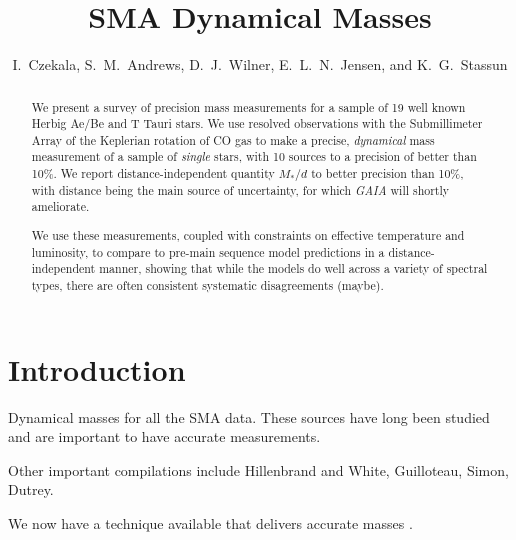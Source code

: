 \documentclass[twocolumn]{aastex6}
\begin{document}
\title{SMA Dynamical Masses}
\author{I.~Czekala, S.~M.~Andrews, D.~J.~Wilner, E.~L.~N.~Jensen, and K.~G.~Stassun}

\begin{abstract}
We present a survey of precision mass measurements for a sample of 19 well known Herbig Ae/Be and T Tauri stars. We use resolved observations with the Submillimeter Array of the Keplerian rotation of CO gas to make a precise, \emph{dynamical} mass measurement of a sample of \emph{single} stars, with 10 sources to a precision of better than 10\%. We report distance-independent quantity $M_\ast/d$ to better precision than 10\%, with distance being the main source of uncertainty, for which \emph{GAIA} will shortly ameliorate.

We use these measurements, coupled with constraints on effective temperature and luminosity, to compare to pre-main sequence model predictions in a distance-independent manner, showing that while the models do well across a variety of spectral types, there are often consistent systematic disagreements (maybe).
\end{abstract}


\section{Introduction}

Dynamical masses for all the SMA data. These sources have long been studied and are important to have accurate measurements.

Other important compilations include Hillenbrand and White, Guilloteau, Simon, Dutrey.

We now have a technique available that delivers accurate masses \citep{rosenfeld12b, czekala15a, czekala16}.
\end{document}
